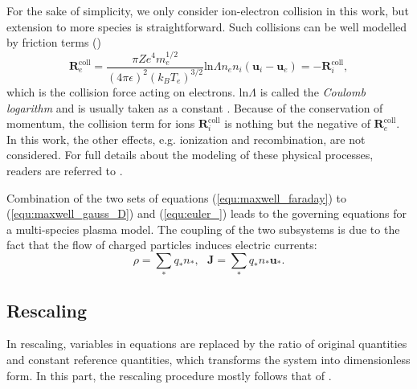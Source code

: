 \documentclass{article}
\begin{document}
For the sake of simplicity, we only consider ion-electron collision in this work, but extension to more species is straightforward. Such collisions can be well modelled by friction terms (\citep[][Sec. 5.6.2]{chen2016})
\begin{equation} \label{equ:collision}
    \mathbf{R}_{e}^{\text{coll}} = \frac{\pi Ze^4m_e^{1/2}}{(4\pi\epsilon)^2(k_BT_e)^{3/2}}\text{ln}\Lambda n_en_i(\mathbf{u}_i - \mathbf{u}_e) = - \mathbf{R}_{i}^{\text{coll}},  
\end{equation}
which is the collision force acting on electrons. ln$\Lambda$ is called the \emph{Coulomb logarithm} and is usually taken as a constant \cite{chen2016}. Because of the conservation of momentum, the collision term for ions $\mathbf{R}_{i}^{\text{coll}}$ is nothing but the negative of $\mathbf{R}_{e}^{\text{coll}}$. In this work, the other effects, e.g. ionization and recombination, are not considered. For full details about the modeling of these physical processes, readers are referred to \cite[][Sec. 3.2]{fuchs_2021}.  


Combination of the two sets of equations (\ref{equ:maxwell_faraday}) to (\ref{equ:maxwell_gauss_D}) and (\ref{equ:euler_}) leads to the governing equations for a multi-species plasma model. The coupling of the two subsystems is due to the fact that the flow of charged particles induces electric currents:
\begin{equation} \label{equ:maxwell_euler_coupling}
    \rho = \sum_* q_*n_*, \ \ \  \mathbf{J} = \sum_* q_*n_*\mathbf{u}_*. 
\end{equation}

\subsection{Rescaling} \label{sec:rescaling}
In rescaling, variables in equations are replaced by the ratio of original quantities and constant reference quantities, which transforms the system into dimensionless form. In this part, the rescaling procedure mostly follows that of \cite[][Sec. 2.2]{degond_2017}.
\end{document}
